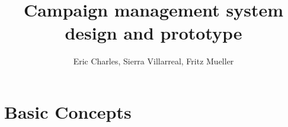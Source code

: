 \documentclass[OPS,authoryear,toc]{lsstdoc}
\title{Campaign management system design and prototype}
\author{%
    Eric Charles,
    Sierra Villarreal,
    Fritz Mueller
}
\date{\vcsDate}
\begin{document}
\mkshorttitle

\section{Basic Concepts} \label{sec:concepts}
\end{document}
